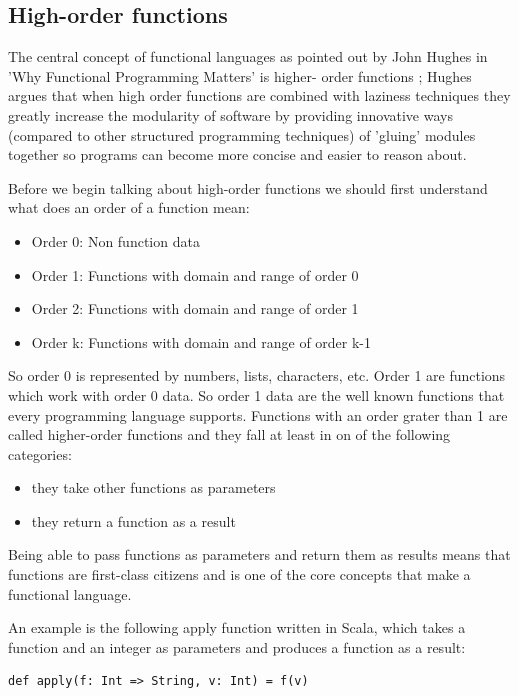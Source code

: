 \documentclass{article}
\begin{document}
\subsection {High-order functions}
The central concept of functional languages as pointed out by John Hughes \cite{DBLP:journals/cj/Hughes89} in 'Why Functional Programming Matters' is higher- order functions ; Hughes argues that when high order functions are combined with laziness techniques they greatly increase the modularity of software by providing innovative ways (compared to other structured programming techniques) of 'gluing' modules together so programs can become more concise and easier to reason about. 

Before we begin talking about high-order functions we should first understand what does an order of a function mean:

\begin{itemize}
\item Order 0: Non function data
\item Order 1: Functions with domain and range of order 0
\item Order 2: Functions with domain and range of order 1
\item Order k: Functions with domain and range of order k-1
\end{itemize}

So order 0 is represented by numbers, lists, characters, etc. Order 1 are functions which work with order 0 data. So order 1 data are the well known functions that every programming language supports. 
Functions with an order grater than 1 are called higher-order functions and they fall at least in on of the following categories:
\begin{itemize}
\item they take other functions as parameters
\item they return a function as a result
\end{itemize}

Being able to pass functions as parameters and return them as results means that functions are first-class citizens and is one of the  core concepts that make a functional language.

An example is the following apply function written in Scala, which takes a function  and an integer as parameters and produces  a function as a result: \par

\begin{lstlisting} 
def apply(f: Int => String, v: Int) = f(v)
\end{lstlisting} 
\end{document}
